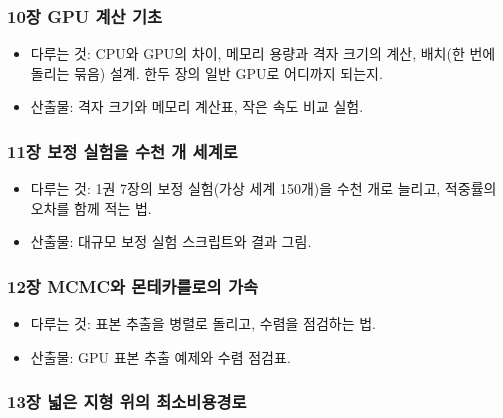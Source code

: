 \hypertarget{uxc7a5-gpu-uxacc4uxc0b0-uxae30uxcd08}{%
\subsubsection{10장 GPU 계산 기초}\label{uxc7a5-gpu-uxacc4uxc0b0-uxae30uxcd08}}

\begin{itemize}
\tightlist
\item
  다루는 것: CPU와 GPU의 차이, 메모리 용량과 격자 크기의 계산, 배치(한 번에 돌리는 묶음) 설계. 한두 장의 일반 GPU로 어디까지 되는지.
\item
  산출물: 격자 크기와 메모리 계산표, 작은 속도 비교 실험.
\end{itemize}

\hypertarget{uxc7a5-uxbcf4uxc815-uxc2e4uxd5d8uxc744-uxc218uxcc9c-uxac1c-uxc138uxacc4uxb85c}{%
\subsubsection{11장 보정 실험을 수천 개 세계로}\label{uxc7a5-uxbcf4uxc815-uxc2e4uxd5d8uxc744-uxc218uxcc9c-uxac1c-uxc138uxacc4uxb85c}}

\begin{itemize}
\tightlist
\item
  다루는 것: 1권 7장의 보정 실험(가상 세계 150개)을 수천 개로 늘리고, 적중률의 오차를 함께 적는 법.
\item
  산출물: 대규모 보정 실험 스크립트와 결과 그림.
\end{itemize}

\hypertarget{uxc7a5-mcmcuxc640-uxbaacuxd14cuxce74uxb97cuxb85cuxc758-uxac00uxc18d}{%
\subsubsection{12장 MCMC와 몬테카를로의 가속}\label{uxc7a5-mcmcuxc640-uxbaacuxd14cuxce74uxb97cuxb85cuxc758-uxac00uxc18d}}

\begin{itemize}
\tightlist
\item
  다루는 것: 표본 추출을 병렬로 돌리고, 수렴을 점검하는 법.
\item
  산출물: GPU 표본 추출 예제와 수렴 점검표.
\end{itemize}

\hypertarget{uxc7a5-uxb113uxc740-uxc9c0uxd615-uxc704uxc758-uxcd5cuxc18cuxbe44uxc6a9uxacbduxb85c}{%
\subsubsection{13장 넓은 지형 위의 최소비용경로}\label{uxc7a5-uxb113uxc740-uxc9c0uxd615-uxc704uxc758-uxcd5cuxc18cuxbe44uxc6a9uxacbduxb85c}}


